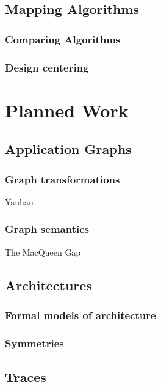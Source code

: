 \documentclass{article}
\begin{document}
\subsection{Mapping Algorithms}
\subsubsection{Comparing Algorithms}
\subsubsection{Design centering}

\section{Planned Work}

\subsection{Application Graphs}
\subsubsection{Graph transformations}
\"Yauhau

\subsubsection{Graph semantics}
The MacQueen Gap

\subsection{Architectures}

\subsubsection{Formal models of architecture}

\subsubsection{Symmetries}


\subsection{Traces}
\end{document}
